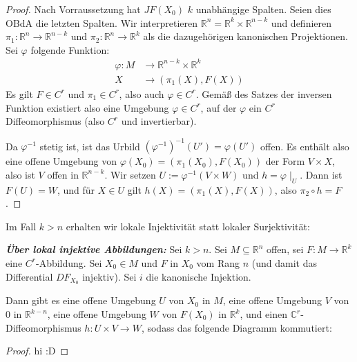 \documentclass{report}
\newcommand*{\newpar}{\par\vspace{\baselineskip}\noindent}
\newcommand{\tbf}[1]{\textbf{#1}}
\newcommand{\bC}{\mathbb{C}}
\newcommand{\bR}{\mathbb{R}}
\begin{document}
\begin{proof}
Nach Vorraussetzung hat $JF(X_0)$ $k$ unabhängige Spalten. Seien dies OBdA die letzten Spalten. Wir interpretieren $\bR^n = \bR^k \times \bR^{n-k}$ und definieren $\pi_1 : \bR^n \to \bR^{n-k}$ und $\pi_2 : \bR^n \to \bR^k$ als die dazugehörigen kanonischen Projektionen. Sei $\varphi$ folgende Funktion:
\begin{align*}
 \varphi : M &\to \bR^{n-k} \times \bR^k\\
 X &\to (\pi_1(X), F(X))
\end{align*}
Es gilt $F \in C^r$ und $\pi_1 \in C^r$, also auch $\varphi \in C^r$. Gemäß des Satzes der inversen Funktion existiert also eine Umgebung $\varphi \in C^r$, auf der $\varphi$ ein $C^r$ Diffeomorphismus (also $C^r$ und invertierbar).
\newpar
Da $\varphi^{-1}$ stetig ist, ist das Urbild $(\varphi^{-1})^{-1}(U') = \varphi(U')$ offen. Es enthält also eine offene Umgebung von $\varphi(X_0) = (\pi_1(X_0), F(X_0))$ der Form $V \times X$, also ist $V$ offen in $\bR^{n-k}$. Wir setzen $U := \varphi^{-1}(V \times W)$ und $h = \varphi \mid_U$. Dann ist $F(U) = W$, und für $X \in U$ gilt $h(X) = (\pi_1(X), F(X))$, also $\pi_2 \circ h = F$.
\end{proof}
\noindent Im Fall $k > n$ erhalten wir lokale Injektivität statt lokaler Surjektivität:
\begin{theorem}
 \emph{\tbf{Über lokal injektive Abbildungen:}} Sei $k > n$. Sei $M \subseteq \bR^n$ offen, sei $F : M \to \bR^k$ eine $C^r$-Abbildung. Sei $X_0 \in M$ und $F$ in $X_0$ vom Rang $n$ (und damit das Differential $DF_{X_0}$ injektiv). Sei $i$ die kanonische Injektion.
 \newpar
 Dann gibt es eine offene Umgebung $U$ von $X_0$ in $M$, eine offene Umgebung $V$ von $0$ in $\bR^{k-n}$, eine offene Umgebung $W$ von $F(X_0)$ in $\bR^k$, und einen $\bC^r$-Diffeomorphismus $h : U \times V \to W$, sodass das folgende Diagramm kommutiert:
 \FloatBarrier
 \begin{figure}[h!]
 \centering
\end{figure}
\end{theorem}
\FloatBarrier
\begin{proof}
 hi :D
\end{proof}
\clearpage
[...]
\clearpage
%
%
%
%
%
%
%
%
%
%
%
%
%
%
%
\end{document}
